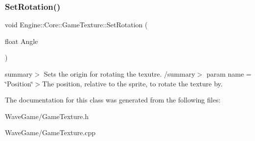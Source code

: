 \subsubsection{\texorpdfstring{Set\+Rotation()}{SetRotation()}}
{\footnotesize\ttfamily void Engine\+::\+Core\+::\+Game\+Texture\+::\+Set\+Rotation (\begin{DoxyParamCaption}\item[{float}]{Angle }\end{DoxyParamCaption})}

summary$>$ Sets the origin for rotating the texutre. /summary$>$ param name = \char`\"{}\+Position\char`\"{}$>$The position, relative to the sprite, to rotate the texture by.

The documentation for this class was generated from the following files\+:\begin{DoxyCompactItemize}
\item 
Wave\+Game/Game\+Texture.\+h\item 
Wave\+Game/Game\+Texture.\+cpp\end{DoxyCompactItemize}
